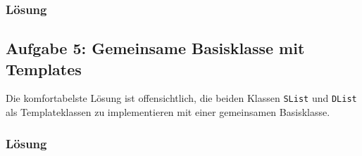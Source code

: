 \subsubsection{Lösung}


\noindent\makebox[\linewidth]{\rule{\paperwidth}{0.4pt}}

\noindent\makebox[\linewidth]{\rule{\paperwidth}{0.4pt}}

\noindent\makebox[\linewidth]{\rule{\paperwidth}{0.4pt}}

\noindent\makebox[\linewidth]{\rule{\paperwidth}{0.4pt}}


\subsection{Aufgabe 5: Gemeinsame Basisklasse mit Templates}

Die komfortabelste Lösung ist offensichtlich, die beiden Klassen \texttt{SList} und \texttt{DList} als Templateklassen zu implementieren mit einer gemeinsamen Basisklasse.

\subsubsection{Lösung}


\noindent\makebox[\linewidth]{\rule{\paperwidth}{0.4pt}}

\noindent\makebox[\linewidth]{\rule{\paperwidth}{0.4pt}}

\noindent\makebox[\linewidth]{\rule{\paperwidth}{0.4pt}}

